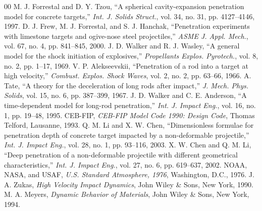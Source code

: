 \documentclass[journal,10pt,twocolumn]{IEEEtran}
\begin{document}
\begin{thebibliography}{00}
 M. J. Forrestal and D. Y. Tzou, ``A spherical cavity-expansion penetration model for concrete targets,'' \emph{Int. J. Solids Struct.}, vol. 34, no. 31, pp. 4127--4146, 1997.
 D. J. Frew, M. J. Forrestal, and S. J. Hanchak, ``Penetration experiments with limestone targets and ogive-nose steel projectiles,'' \emph{ASME J. Appl. Mech.}, vol. 67, no. 4, pp. 841--845, 2000.
 J. D. Walker and R. J. Wasley, ``A general model for the shock initiation of explosives,'' \emph{Propellants Explos. Pyrotech.}, vol. 8, no. 2, pp. 1--17, 1969.
 V. P. Alekseevskii, ``Penetration of a rod into a target at high velocity,'' \emph{Combust. Explos. Shock Waves}, vol. 2, no. 2, pp. 63--66, 1966.
 A. Tate, ``A theory for the deceleration of long rods after impact,'' \emph{J. Mech. Phys. Solids}, vol. 15, no. 6, pp. 387--399, 1967.
 J. D. Walker and C. E. Anderson, ``A time-dependent model for long-rod penetration,'' \emph{Int. J. Impact Eng.}, vol. 16, no. 1, pp. 19--48, 1995.
 CEB-FIP, \emph{CEB-FIP Model Code 1990: Design Code}, Thomas Telford, Lausanne, 1993.
 Q. M. Li and X. W. Chen, ``Dimensionless formulae for penetration depth of concrete target impacted by a non-deformable projectile,'' \emph{Int. J. Impact Eng.}, vol. 28, no. 1, pp. 93--116, 2003.
 X. W. Chen and Q. M. Li, ``Deep penetration of a non-deformable projectile with different geometrical characteristics,'' \emph{Int. J. Impact Eng.}, vol. 27, no. 6, pp. 619--637, 2002.
 NOAA, NASA, and USAF, \emph{U.S. Standard Atmosphere, 1976}, Washington, D.C., 1976.
 J. A. Zukas, \emph{High Velocity Impact Dynamics}, John Wiley \& Sons, New York, 1990.
 M. A. Meyers, \emph{Dynamic Behavior of Materials}, John Wiley \& Sons, New York, 1994.
\end{thebibliography}
\end{document}
